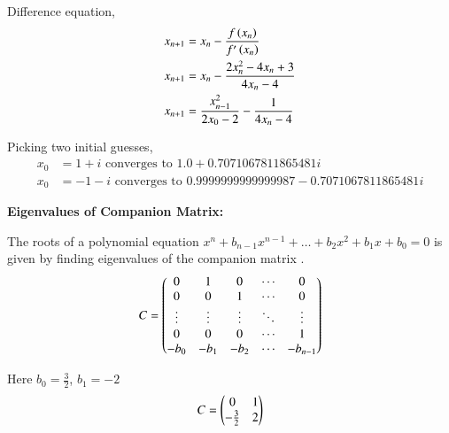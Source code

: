 \documentclass[journal]{IEEEtran}
\begin{document}
Difference equation,
\begin{align}
    x_{n+1} &= x_n - \frac{f\left(x_{n}\right)}{f^\prime\left(x_n\right)} \\
    x_{n+1} &= x_n - \frac{2x_n^2 - 4x_n + 3}{4x_n - 4} \\
    x_{n+1} &= \frac{x^{2}_{n-1}}{2x_{0}-2}  - \frac{1}{4x_n - 4}
\end{align}

Picking two initial guesses,
\begin{align}
    x_0 &= 1+i \text{ converges to } 1.0 + 0.7071067811865481i \\
    x_0 &= -1-i \text{ converges to } 0.9999999999999987 - 0.7071067811865481i 
\end{align}

\textbf{Eigenvalues of Companion Matrix:}

The roots of a polynomial equation $x^n+b_{n-1}x^{n-1}+\dots+b_2x^2+b_1x+b_0 = 0$ is given by finding eigenvalues of the companion matrix .
\begin{align}
    C = \begin{pmatrix}0&1&0&\cdots&0\\ 0&0&1&\cdots&0\\ \vdots &\vdots &\vdots &\ddots&\vdots\\0&0&0&\cdots&1\\-b_0&-b_1&-b_2&\cdots&-b_{n-1}\end{pmatrix}
\end{align}

Here $b_0 =\frac{3}{2}$, $b_1 = -2$
\begin{align}
    C = \begin{pmatrix}0&1 \\ -\frac{3}{2}&2\end{pmatrix}
\end{align}
\end{document}
